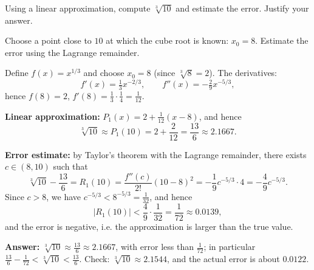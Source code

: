 
\begin{question}
Using a linear approximation, compute $\sqrt[3]{10}$ and estimate the error. Justify your answer.
\end{question}

\begin{hint}
Choose a point close to $10$ at which the cube root is known: $x_0 = 8$. Estimate the error using the Lagrange remainder.
\end{hint}

\begin{solution}
Define $f(x) = x^{1/3}$ and choose $x_0 = 8$ (since $\sqrt[3]{8} = 2$). The derivatives:
\[ f'(x) = \tfrac13x^{-2/3}, \qquad f''(x) = -\tfrac29x^{-5/3}, \]
hence $f(8) = 2$, $f'(8) = \frac13\cdot\frac14 = \frac1{12}$.

\textbf{Linear approximation:} $P_1(x) = 2 + \frac{1}{12}(x - 8)$, and hence
\[ \sqrt[3]{10} \approx P_1(10) = 2 + \frac{2}{12} = \frac{13}{6} \approx 2.1667. \]

\textbf{Error estimate:} by Taylor's theorem with the Lagrange remainder, there exists $c \in (8, 10)$ such that
\[ \sqrt[3]{10} - \frac{13}{6} = R_1(10) = \frac{f''(c)}{2!}(10 - 8)^2 = -\frac19c^{-5/3}\cdot 4 = -\frac{4}{9}c^{-5/3}. \]
Since $c > 8$, we have $c^{-5/3} < 8^{-5/3} = \frac1{32}$, and hence
\[ |R_1(10)| < \frac49\cdot\frac{1}{32} = \frac{1}{72} \approx 0.0139, \]
and the error is negative, i.e. the approximation is larger than the true value.

\textbf{Answer:} $\sqrt[3]{10} \approx \frac{13}{6} \approx 2.1667$, with error less than $\frac{1}{72}$; in particular $\frac{13}{6} - \frac1{72} < \sqrt[3]{10} < \frac{13}{6}$.
Check: $\sqrt[3]{10} \approx 2.1544$, and the actual error is about $0.0122$.
\end{solution}
